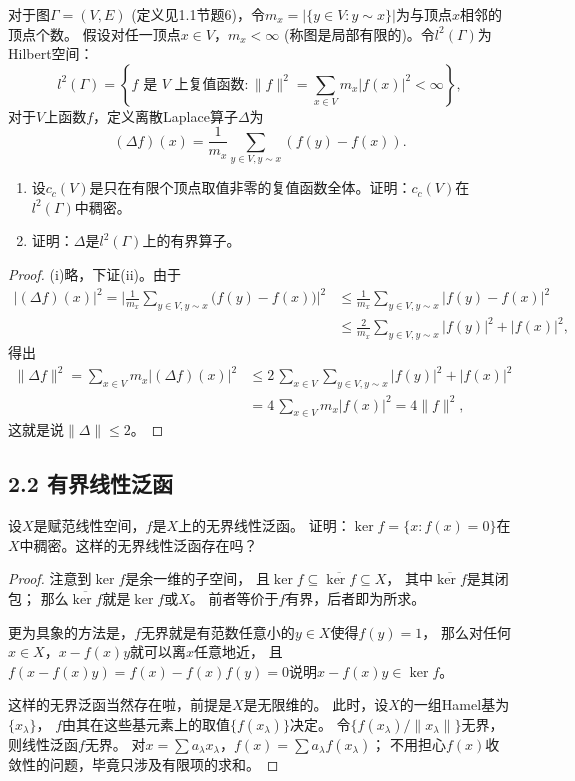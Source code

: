 \begin{9}
    对于图$\varGamma=(V,E)$ (定义见1.1节题6)，令$m_x=|\{y \in V:y \sim x\}|$为与顶点$x$相邻的顶点个数。
    假设对任一顶点$x \in V$，$m_x<\infty$ (称图是局部有限的)。令$l^2(\varGamma)$为Hilbert空间：
    \[l^2(\varGamma)=\left\{f\text{ 是 }V\text{ 上复值函数}:\|f\|^2=\sum_{x \in V}m_x|f(x)|^2<\infty\right\},\]
    对于$V$上函数$f$，定义离散Laplace算子$\Delta$为
    \[(\Delta f)(x)=\frac{1}{m_x}\sum_{y \in V,y \sim x}(f(y)-f(x)).\]
    \begin{enumerate}
    \item[(i)] 设$c_c(V)$是只在有限个顶点取值非零的复值函数全体。证明：$c_c(V)$在$l^2(\varGamma)$中稠密。
    \item[(ii)] 证明：$\Delta$是$l^2(\varGamma)$上的有界算子。
    \end{enumerate}
\end{9}
\begin{proof}
    (i)略，下证(ii)。由于
    \begin{align*}
        |(\Delta f)(x)|^2=\bigg|\frac{1}{m_x}\sum_{y \in V,y \sim x}\big(f(y)-f(x)\big)\bigg|^2
        &\leqslant\frac{1}{m_x}\sum_{y \in V,y \sim x}|f(y)-f(x)|^2\\
        &\leqslant\frac{2}{m_x}\sum_{y \in V,y \sim x}|f(y)|^2+|f(x)|^2,
    \end{align*}
    得出
    \begin{align*}
        \|\Delta f\|^2=\sum_{x \in V}m_x|(\Delta f)(x)|^2
        &\leqslant2\,\sum_{x \in V}\sum_{y \in V,y \sim x}|f(y)|^2+|f(x)|^2\\
        &=4\,\sum_{x \in V}m_x|f(x)|^2=4\|f\|^2,
    \end{align*}
    这就是说$\|\Delta\|\leqslant2$。
\end{proof}

\subsection{2.2 有界线性泛函}
\begin{2}
    设$X$是赋范线性空间，$f$是$X$上的无界线性泛函。
    证明：$\ker f=\{x:f(x)=0\}$在$X$中稠密。这样的无界线性泛函存在吗？
\end{2}
\begin{proof}
    注意到$\ker f$是余一维的子空间，
    且$\ker f \subseteq \overline{\ker f} \subseteq X$，
    其中$\overline{\ker f}$是其闭包；
    那么$\overline{\ker f}$就是$\ker f$或$X$。
    前者等价于$f$有界，后者即为所求。

    更为具象的方法是，$f$无界就是有范数任意小的$y \in X$使得$f(y)=1$，
    那么对任何$x \in X$，$x-f(x)y$就可以离$x$任意地近，
    且$f(x-f(x)y)=f(x)-f(x)f(y)=0$说明$x-f(x)y \in \ker f$。

    这样的无界泛函当然存在啦，前提是$X$是无限维的。
    此时，设$X$的一组Hamel基为$\{x_\lambda\}$，
    $f$由其在这些基元素上的取值$\{f(x_\lambda)\}$决定。
    令$\{f(x_\lambda)/\|x_\lambda\|\}$无界，则线性泛函$f$无界。
    对$x=\sum a_\lambda x_\lambda$，$f(x)=\sum a_\lambda f(x_\lambda)$；
    不用担心$f(x)$收敛性的问题，毕竟只涉及有限项的求和。
\end{proof}


